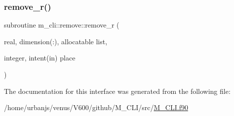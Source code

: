 \mbox{\label{interfacem__cli_1_1remove_a37084cd7166efe0231e50a8ba9d99bac}} 
\subsubsection{\texorpdfstring{remove\+\_\+r()}{remove\_r()}}
{\footnotesize\ttfamily subroutine m\+\_\+cli\+::remove\+::remove\+\_\+r (\begin{DoxyParamCaption}\item[{real, dimension(\+:), allocatable}]{list,  }\item[{integer, intent(in)}]{place }\end{DoxyParamCaption})\hspace{0.3cm}{\ttfamily [private]}}



The documentation for this interface was generated from the following file\+:\begin{DoxyCompactItemize}
\item 
/home/urbanjs/venus/\+V600/github/\+M\+\_\+\+C\+L\+I/src/\mbox{\hyperlink{M__CLI_8f90}{M\+\_\+\+C\+L\+I.\+f90}}\end{DoxyCompactItemize}
